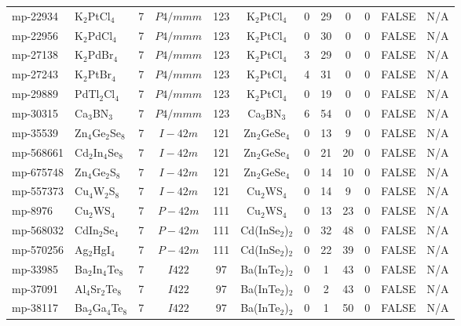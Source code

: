 {\begin{longtable}{llcccccccccc}
    mp-22934 & K$_{2}$PtCl$_{4}$ & 7     & $P4/mmm$ & 123   & K$_{2}$PtCl$_{4}$ & 0     & 29    & 0     & 0     & FALSE & N/A \\
    mp-22956 & K$_{2}$PdCl$_{4}$ & 7     & $P4/mmm$ & 123   & K$_{2}$PtCl$_{4}$ & 0     & 30    & 0     & 0     & FALSE & N/A \\
    mp-27138 & K$_{2}$PdBr$_{4}$ & 7     & $P4/mmm$ & 123   & K$_{2}$PtCl$_{4}$ & 3     & 29    & 0     & 0     & FALSE & N/A \\
    mp-27243 & K$_{2}$PtBr$_{4}$ & 7     & $P4/mmm$ & 123   & K$_{2}$PtCl$_{4}$ & 4     & 31    & 0     & 0     & FALSE & N/A \\
    mp-29889 & PdTl$_{2}$Cl$_{4}$ & 7     & $P4/mmm$ & 123   & K$_{2}$PtCl$_{4}$ & 0     & 19    & 0     & 0     & FALSE & N/A \\
    mp-30315 & Ca$_{3}$BN$_{3}$ & 7     & $P4/mmm$ & 123   & Ca$_{3}$BN$_{3}$ & 6     & 54    & 0     & 0     & FALSE & N/A \\
    mp-35539 & Zn$_{4}$Ge$_{2}$Se$_{8}$ & 7     & $I-42m$ & 121   & Zn$_{2}$GeSe$_{4}$ & 0     & 13    & 9     & 0     & FALSE & N/A \\
    mp-568661 & Cd$_{2}$In$_{4}$Se$_{8}$ & 7     & $I-42m$ & 121   & Zn$_{2}$GeSe$_{4}$ & 0     & 21    & 20    & 0     & FALSE & N/A \\
    mp-675748 & Zn$_{4}$Ge$_{2}$S$_{8}$ & 7     & $I-42m$ & 121   & Zn$_{2}$GeSe$_{4}$ & 0     & 14    & 10    & 0     & FALSE & N/A \\
    mp-557373 & Cu$_{4}$W$_{2}$S$_{8}$ & 7     & $I-42m$ & 121   & Cu$_{2}$WS$_{4}$ & 0     & 14    & 9     & 0     & FALSE & N/A \\
    mp-8976 & Cu$_{2}$WS$_{4}$ & 7     & $P-42m$ & 111   & Cu$_{2}$WS$_{4}$ & 0     & 13    & 23    & 0     & FALSE & N/A \\
    mp-568032 & CdIn$_{2}$Se$_{4}$ & 7     & $P-42m$ & 111   & Cd(InSe$_{2}$)$_{2}$ & 0     & 32    & 48    & 0     & FALSE & N/A \\
    mp-570256 & Ag$_{2}$HgI$_{4}$ & 7     & $P-42m$ & 111   & Cd(InSe$_{2}$)$_{2}$ & 0     & 22    & 39    & 0     & FALSE & N/A \\
    mp-33985 & Ba$_{2}$In$_{4}$Te$_{8}$ & 7     & $I422$ & 97    & Ba(InTe$_{2}$)$_{2}$ & 0     & 1     & 43    & 0     & FALSE & N/A \\
    mp-37091 & Al$_{4}$Sr$_{2}$Te$_{8}$ & 7     & $I422$ & 97    & Ba(InTe$_{2}$)$_{2}$ & 0     & 2     & 43    & 0     & FALSE & N/A \\
    mp-38117 & Ba$_{2}$Ga$_{4}$Te$_{8}$ & 7     & $I422$ & 97    & Ba(InTe$_{2}$)$_{2}$ & 0     & 1     & 50    & 0     & FALSE & N/A \\

\end{longtable}}
